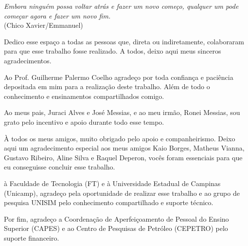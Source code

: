 \documentclass[Portugues,Final]{tese-FT}
\begin{document}
        \paginasiniciais
        
         \begin{epigrafe}
        {\it
                Embora ninguém possa voltar atrás e fazer um novo começo, 
                qualquer um pode começar agora e fazer um novo fim.\\
        }
        \hfill (Chico Xavier/Emmanuel)
        \end{epigrafe}
        Dedico esse espaço a todas as pessoas que, direta ou indiretamente, colaboraram para que esse trabalho fosse realizado. A todos, deixo aqui meus sinceros agradecimentos.
        \newline
        \par
        Ao Prof. Guilherme Palermo Coelho agradeço por toda confiança e paciência depositada em mim para a realização deste trabalho. Além de todo o conhecimento e ensinamentos compartilhados comigo.
        \newline
        \par
        Ao meus pais, Juraci Alves e José Messias, e ao meu irmão, Ronei Messias, sou grato pelo incentivo e apoio durante todo esse tempo.
        \newline
        \par
        À todos os meus amigos, muito obrigado pelo apoio e companheirismo. Deixo aqui um agradecimento especial aos meus amigos Kaio Borges, Matheus Vianna, Gustavo Ribeiro, Aline Silva e Raquel Deperon, vocês foram essenciais para que eu conseguisse concluir esse trabalho.
        \newline
        \par
        à Faculdade de Tecnologia (FT) e à Universidade Estadual de Campinas (Unicamp), agradeço pela oportunidade de realizar esse trabalho e ao grupo de pesquisa UNISIM pelo conhecimento compartilhado e suporte técnico.
        \newline
        \par
        Por fim, agradeço a Coordenação de Aperfeiçoamento de Pessoal do Ensino Superior (CAPES) e ao Centro de Pesquisas de Petróleo (CEPETRO) pelo suporte financeiro.
\end{document}
